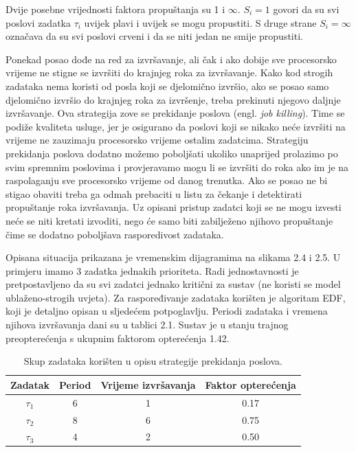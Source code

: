 \documentclass[../zavrsni.tex]{subfiles}
\begin{document}
Dvije posebne vrijednosti faktora propuštanja su 1 i $\infty$. $S_i=1$ govori da su svi poslovi zadatka $\tau_i$ uvijek plavi i uvijek se 
mogu propustiti. S druge strane $S_i=\infty$ označava da su svi poslovi crveni i da se niti jedan ne smije propustiti.

Ponekad posao dođe na red za izvršavanje, ali čak i ako dobije sve procesorsko vrijeme ne stigne se izvršiti do krajnjeg roka za izvršavanje.
Kako kod strogih zadataka nema koristi od posla koji se djelomično izvršio, ako se posao samo djelomično izvršio do krajnjeg roka za izvršenje, 
treba prekinuti njegovo daljnje izvršavanje.
 Ova strategija zove se prekidanje poslova 
 (engl. \textit{job killing}). Time se podiže kvaliteta usluge, jer je osigurano da poslovi koji se nikako neće 
 izvršiti na vrijeme ne zauzimaju procesorsko vrijeme ostalim zadatcima. Strategiju prekidanja poslova dodatno možemo poboljšati
 ukoliko unaprijed prolazimo po svim spremnim poslovima i provjeravamo mogu li se izvršiti do roka ako im je na raspolaganju sve 
 procesorsko vrijeme od danog trenutka. Ako se posao ne bi stigao obaviti treba ga odmah prebaciti u listu za čekanje i detektirati 
 propuštanje roka izvršavanja. Uz opisani pristup zadatci koji se ne mogu izvesti neće se niti kretati izvoditi, nego će samo
 biti zabilježeno njihovo propuštanje čime se dodatno poboljšava rasporedivost zadataka.

Opisana situacija prikazana je vremenskim dijagramima na slikama 2.4 i 2.5. U primjeru imamo 3 zadatka jednakih prioriteta. Radi jednostavnosti
je pretpostavljeno da su svi zadatci jednako kritični za sustav (ne koristi se model ublaženo-strogih uvjeta). Za raspoređivanje zadataka korišten je algoritam EDF, koji je detaljno  opisan u sljedećem potpoglavlju. 
Periodi zadataka i vremena njihova izvršavanja dani su u tablici 2.1. Sustav je u stanju trajnog preopterećenja s ukupnim
faktorom opterećenja 1.42.

\begin{table}[h!]
\begin{center}
  \begin{tabular}{||c || c | c | c||} 
   \hline
   Zadatak & Period & Vrijeme izvršavanja & Faktor opterećenja \\ [0.5ex] 
   \hline\hline
   $\tau_1$ & 6 & 1 & 0.17 \\ 
   \hline
   $\tau_2$ & 8 & 6 & 0.75 \\
   \hline
   $\tau_3$ & 4 & 2 & 0.50 \\
   \hline
  \end{tabular}
\end{center}
\caption{\label{tab:table-name}Skup zadataka korišten u opisu strategije prekidanja poslova.}
\end{table}
\end{document}
